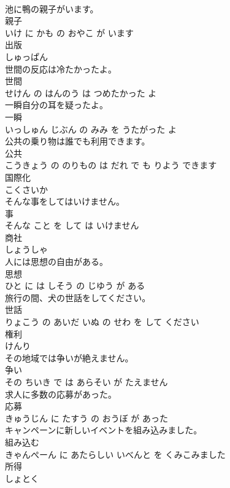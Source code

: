 \documentclass[8pt]{extreport}
\begin{document}
\begin{CJK}{UTF8}{min}
\\	池に鴨の親子がいます。	
\\	親子 
\\	いけ に かも の おやこ が います			
\\	出版	
\\	しゅっぱん			
\\	世間の反応は冷たかったよ。	
\\	世間 
\\	せけん の はんのう は つめたかった よ			
\\	一瞬自分の耳を疑ったよ。	
\\	一瞬 
\\	いっしゅん じぶん の みみ を うたがった よ			
\\	公共の乗り物は誰でも利用できます。	
\\	公共 
\\	こうきょう の のりもの は だれ で も りよう できます			
\\	国際化	
\\	こくさいか			
\\	そんな事をしてはいけません。	
\\	事 
\\	そんな こと を して は いけません			
\\	商社	
\\	しょうしゃ			
\\	人には思想の自由がある。	
\\	思想 
\\	ひと に は しそう の じゆう が ある			
\\	旅行の間、犬の世話をしてください。	
\\	世話 
\\	りょこう の あいだ いぬ の せわ を して ください			
\\	権利	
\\	けんり			
\\	その地域では争いが絶えません。	
\\	争い 
\\	その ちいき で は あらそい が たえません			
\\	求人に多数の応募があった。	
\\	応募 
\\	きゅうじん に たすう の おうぼ が あった			
\\	キャンペーンに新しいイベントを組み込みました。	
\\	組み込む 
\\	きゃんぺーん に あたらしい いべんと を くみこみました			
\\	所得	
\\	しょとく			

\end{CJK}
\end{document}
